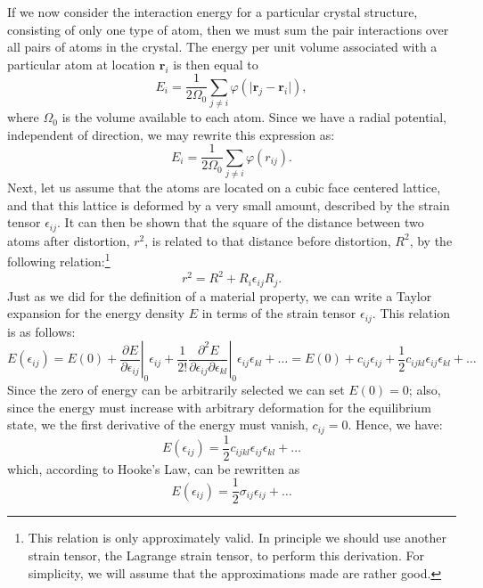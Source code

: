 If we now consider the interaction energy for a particular crystal structure, consisting of only one type of atom, then we must sum the pair interactions over all pairs of atoms in the crystal.  The energy per unit volume associated with a particular atom at location $\mathbf{r}_i$ is then equal to
\[
	E_i = \frac{1}{2\Omega_0} \sum_{j\ne i} \varphi(\vert\mathbf{r}_j-\mathbf{r}_i\vert),
\]
where $\Omega_0$ is the volume available to each atom.  Since we have a radial potential, independent of direction, we may rewrite this expression as:
\[
	E_i = \frac{1}{2\Omega_0} \sum_{j\ne i} \varphi(r_{ij}).
\]
Next, let us assume that the atoms are located on a cubic face centered lattice, and that this lattice is  deformed by a very small amount, described by the strain tensor $\epsilon_{ij}$.  It can then be shown that the square of the distance between two atoms after distortion, $r^2$, is related to that distance before distortion, $R^2$, by the following relation:\footnote{This relation is only approximately valid.  In principle we should use another strain tensor, the Lagrange strain tensor, to perform this derivation.  For simplicity, we will assume that the approximations made are rather good.}
\begin{equation}
	r^2 = R^2 + R_{i}\epsilon_{ij}R_{j}.\label{\chabbr:eq:rr}
\end{equation}
Just as we did for the definition of a material property, we can write a Taylor expansion for the energy density $E$  in terms of the strain tensor $\epsilon_{ij}$.  This relation is as follows:
\begin{equation}
	E(\epsilon_{ij}) = E(0) +\left.\frac{\partial E}{\partial \epsilon_{ij}}\right\vert_0\epsilon_{ij} +
	\left.\frac{1}{2!}\frac{\partial^2 E}{\partial \epsilon_{ij}\partial\epsilon_{kl}}\right\vert_0\epsilon_{ij}\epsilon_{kl}  + \ldots 
	=E(0) +c_{ij}\epsilon_{ij} + \frac{1}{2}c_{ijkl}\epsilon_{ij}\epsilon_{kl}  + \ldots 
\end{equation}
Since the zero of energy can be arbitrarily selected we can set $E(0)=0$;  also, since the energy must increase with arbitrary deformation for the equilibrium state, we the first derivative of the energy must vanish, $c_{ij}=0$.  Hence, we have:
\begin{equation}
	E(\epsilon_{ij}) = \frac{1}{2}c_{ijkl}\epsilon_{ij}\epsilon_{kl}  + \ldots 
\end{equation}
which, according to Hooke's Law, can be rewritten as
\begin{equation}
	E(\epsilon_{ij}) = \frac{1}{2}\sigma_{ij}\epsilon_{ij}  + \ldots 
\end{equation}


